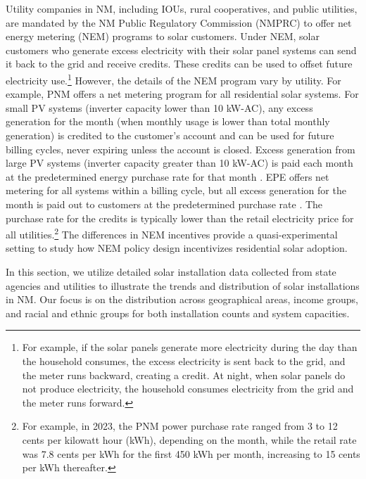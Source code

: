 \documentclass[12pt,twoside,letterpaper]{article}
\begin{document}
Utility companies in NM, including IOUs, rural cooperatives, and public utilities, are mandated by the NM Public Regulatory Commission (NMPRC) to offer net energy metering (NEM) programs to solar customers. Under NEM, solar customers who generate excess electricity with their solar panel systems can send it back to the grid and receive credits. These credits can be used to offset future electricity use.\footnote{For example, if the solar panels generate more electricity during the day than the household consumes, the excess electricity is sent back to the grid, and the meter runs backward, creating a credit. At night, when solar panels do not produce electricity, the household consumes electricity from the grid and the meter runs forward.} However, the details of the NEM program vary by utility. For example, PNM offers a net metering program for all residential solar systems. For small PV systems (inverter capacity lower than 10 kW-AC), any excess generation for the month (when monthly usage is lower than total monthly generation) is credited to the customer’s account and can be used for future billing cycles, never expiring unless the account is closed. Excess generation from large PV systems (inverter capacity greater than 10 kW-AC) is paid each month at the predetermined energy purchase rate for that month \parencite{pnmnet}. EPE offers net metering for all systems within a billing cycle, but all excess generation for the month is paid out to customers at the predetermined purchase rate \parencite{epenet, epenetmid}. The purchase rate for the credits is typically lower than the retail electricity price for all utilities.\footnote{For example, in 2023, the PNM power purchase rate ranged from 3 to 12 cents per kilowatt hour (kWh), depending on the month, while the retail rate was 7.8 cents per kWh for the first 450 kWh per month, increasing to 15 cents per kWh thereafter.} The differences in NEM incentives provide a quasi-experimental setting to study how NEM policy design incentivizes residential solar adoption. 


In this section, we utilize detailed solar installation data collected from state agencies and utilities to illustrate the trends and distribution of solar installations in NM. Our focus is on the distribution across geographical areas, income groups, and racial and ethnic groups for both installation counts and system capacities.
\end{document}
